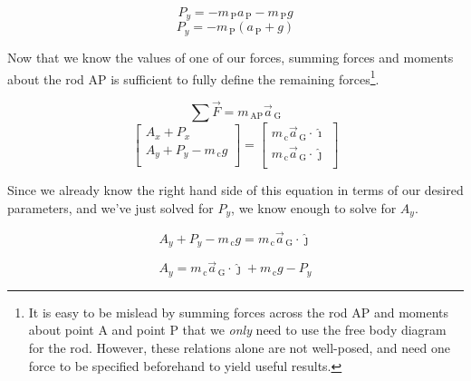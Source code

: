 \documentclass[nofoot,pdf-a,balance,colorlinks,upint,subscriptcorrection,varvw,mathalfa=cal=boondoxo]{asmeconf}
\begin{document}
    \begin{equation}
        P_y = -m_{\,\textrm{P}}a_{\,\textrm{P}} -  m_{\,\textrm{P}}g
    \end{equation}
    \begin{equation}
        P_y = -m_{\,\textrm{P}}\left(a_{\,\textrm{P}} +  g\right)
    \end{equation}

    

    Now that we know the values of one of our forces, summing forces and moments about the rod AP is sufficient to fully define the remaining forces\footnote{It is easy to be mislead by summing forces across the rod AP and moments about point A and point P that we \textit{only} need to use the free body diagram for the rod. However, these relations alone are not well-posed, and need one force to be specified beforehand to yield useful results.}.

    \begin{equation}
        \sum{\vec{F}} = m_{\,\textrm{AP}}\vec{a}_{\,\textrm{G}}
    \end{equation}
    \begin{equation}\label{sum:forces}
        \begin{bmatrix}
            A_x + P_x \\
            A_y + P_y - m_{\,\textrm{c}}g \\
        \end{bmatrix} = 
        \begin{bmatrix}
            m_{\,\textrm{c}}\vec{a}_{\,\textrm{G}} \cdot \hat{\imath} \\
            m_{\,\textrm{c}}\vec{a}_{\,\textrm{G}} \cdot \hat{\jmath} \\
        \end{bmatrix}
    \end{equation}

    Since we already know the right hand side of this equation in terms of our desired parameters, and we've just solved for $P_y$, we know enough to solve for $A_y$.

    \begin{equation} 
        A_y + P_y - m_{\,\textrm{c}}g  = m_{\,\textrm{c}}\vec{a}_{\,\textrm{G}} \cdot \hat{\jmath}
    \end{equation}
    
    \begin{equation} 
        A_y = m_{\,\textrm{c}}\vec{a}_{\,\textrm{G}} \cdot \hat{\jmath} +  m_{\,\textrm{c}}g - P_y
    \end{equation}
\end{document}
